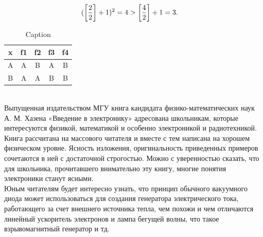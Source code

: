 \[
(\left[\frac{2}{2}\right] + 1)^2 = 4 > \left[\frac{4}{2}\right] + 1 = 3. \hspace{0.4cm}
\]


\begin{table}
    \centering
    \begin{tabular}{ccccc}
        x & f1 & f2 & f3 & f4 \\ \hline
        A & A & B & A & B \\ \hline
        B & A & A & B & B \\
    \end{tabular}
    \caption{Caption}
    \label{tab:my_label}
\end{table}

\\Выпущенная издательством МГУ книга кандидата
физико-математических наук А. М. Хазена «Введение в электронику» адресована школьникам, которые интересуются физикой, математикой и особенно электроникой и радиотехникой.
\\Книга рассчитана на массового читателя и вместе с тем написана на хорошем физическом уровне. Ясность изложения, оригинальность приведенных примеров сочетаются в ней с достаточной строгостью. Можно с уверенностью сказать, что для школьника, прочитавшего внимательно эту книгу, многие понятия электроники станут ясными.
\\Юным читателям будет
интересно узнать, что принцип обычного вакуумного диода может использоваться для создания генератора электрического тока, работающего за счет внешнего источника тепла, чем похожи и чем отличаются линейный ускоритель электронов и лампа бегущей волны, что такое взрывомагнитный генератор и тд.
